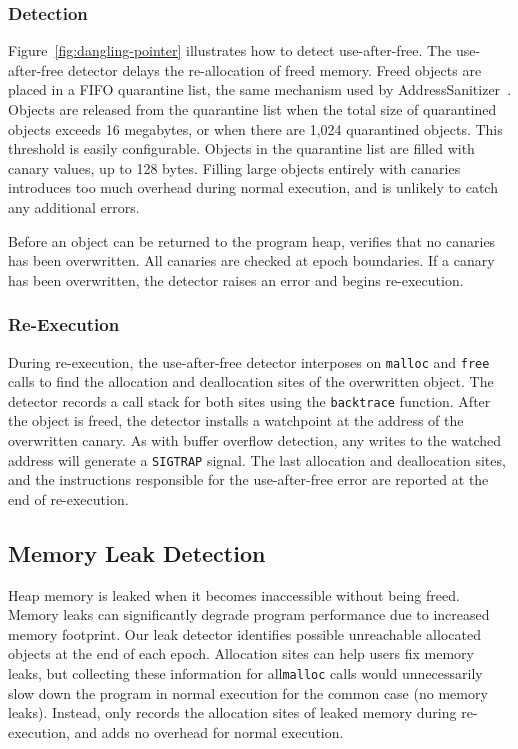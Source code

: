 \subsubsection*{Detection}

Figure~\ref{fig:dangling-pointer} illustrates how to detect use-after-free. The use-after-free detector delays the re-allocation of freed memory. Freed objects are placed in a FIFO quarantine list, the same mechanism used by AddressSanitizer~\cite{AddressSanitizer}. Objects are released from the quarantine list when the total size of quarantined objects exceeds 16 megabytes, or when there are 1,024 quarantined objects. This threshold is easily configurable. Objects in the quarantine list are filled with canary values, up to 128 bytes. Filling large objects entirely with canaries introduces too much overhead during normal execution, and is unlikely to catch any additional errors. 

Before an object can be returned to the program heap, \doubletake{} verifies that no canaries has been overwritten. All canaries are checked at epoch boundaries. If a canary has been overwritten, the detector raises an error and begins re-execution.

\subsubsection*{Re-Execution}

During re-execution, the use-after-free detector interposes on \texttt{malloc} and \texttt{free} calls to find the allocation and deallocation sites of the overwritten object. The detector records a call stack for both sites using the \texttt{backtrace} function. After the object is freed, the detector installs a watchpoint at the address of the overwritten canary. As with buffer overflow detection, any writes to the watched address will generate a \texttt{SIGTRAP} signal. The last allocation and deallocation sites, and the instructions responsible for the use-after-free error are reported at the end of re-execution.


\subsection{Memory Leak Detection}
\label{sec:applications/leak}
Heap memory is leaked when it becomes inaccessible without being freed. Memory leaks can significantly degrade program performance due to increased memory footprint. Our leak detector identifies possible unreachable allocated objects at the end of each epoch. Allocation sites can help users fix memory leaks, but collecting these information for all\texttt{malloc} calls would unnecessarily slow down the program in normal execution for the common case (no memory leaks). Instead, \doubletake{} only records the allocation sites of leaked memory during re-execution, and adds no overhead for normal execution.

